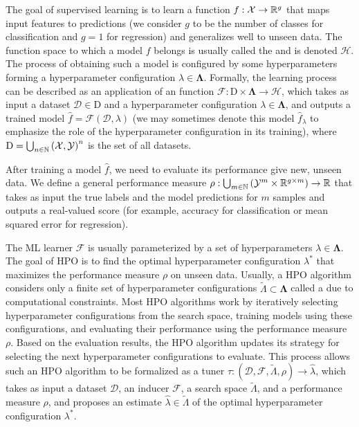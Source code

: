The goal of supervised learning is to learn a function \( f: \mathcal{X} \to \mathbb{R}^g \) that maps input features to predictions (we consider \( g \) to be the number of classes for classification and \( g = 1 \) for regression) and generalizes well to unseen data. The function space to which a model \( f \) belongs is usually called the  and is denoted \( \mathscr{H} \). The process of obtaining such a model is configured by some hyperparameters forming a hyperparameter configuration \( \lambda \in \boldsymbol\Lambda \). Formally, the learning process can be described as an application of an  function \( \mathscr{F} : \mathrm{D} \times \boldsymbol\Lambda \to \mathscr{H} \), which takes as input a dataset \( \mathcal{D} \in \mathrm{D} \) and a hyperparameter configuration \( \lambda \in \boldsymbol\Lambda \), and outputs a trained model \( \hat{f} = \mathscr{F} ( \mathcal{D}, \lambda ) \) (we may sometimes denote this model \( \hat{f}_\lambda \) to emphasize the role of the hyperparameter configuration in its training), where \( \mathrm{D} = \bigcup_{n \in \mathbb{N}} \left( \mathcal{X}, \mathcal{Y} \right)^n \) is the set of all datasets.

After training a model \( \hat{f} \), we need to evaluate its performance give new, unseen data. We define a general performance measure \( \rho : \bigcup_{m \in \mathbb{N}} \left( \mathcal{Y}^m \times \mathbb{R}^{g \times m} \right) \to \mathbb{R} \) that takes as input the true labels and the model predictions for \( m \) samples and outputs a real-valued score (for example, accuracy for classification or mean squared error for regression).

The ML learner \( \mathscr{F} \) is usually parameterized by a set of hyperparameters \( \lambda \in \boldsymbol\Lambda \). The goal of HPO is to find the optimal hyperparameter configuration \( \lambda^* \) that maximizes the performance measure \( \rho \) on unseen data. Usually, a HPO algorithm considers only a finite set of hyperparameter configurations \( \tilde{\Lambda} \subset \boldsymbol\Lambda \) called a  due to computational constraints. Most HPO algorithms work by iteratively selecting hyperparameter configurations from the search space, training models using these configurations, and evaluating their performance using the performance measure \( \rho \). Based on the evaluation results, the HPO algorithm updates its strategy for selecting the next hyperparameter configurations to evaluate. This process allows such an HPO algorithm to be formalized as a tuner \( \tau : \left( \mathcal{D}, \mathscr{F}, \tilde{\Lambda}, \rho \right) \to \hat\lambda \), which takes as input a dataset \( \mathcal{D} \), an inducer \( \mathscr{F} \), a search space \( \tilde{\Lambda} \), and a performance measure \( \rho \), and proposes an estimate \( \hat{\lambda} \in \tilde{\Lambda} \) of the optimal hyperparameter configuration \( \lambda^* \).
